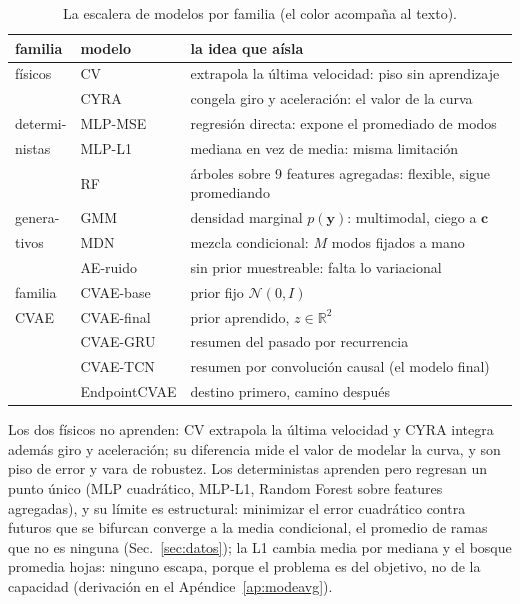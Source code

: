 \documentclass[conference,a4paper]{IEEEtran}
\begin{document}
\begin{table}[!ht]
\caption{La escalera de modelos por familia (el color acompaña al texto).}
\label{tab:escalera}
\centering
\footnotesize
\begin{tabular}{@{}l l p{4.35cm}@{}}
\toprule
familia & modelo & la idea que aísla \\
\midrule
\rowcolor{famfis} físicos & CV & extrapola la última velocidad: piso sin aprendizaje \\
\rowcolor{famfis} & CYRA & congela giro y aceleración: el valor de la curva \\
\rowcolor{famdet} determi- & MLP-MSE & regresión directa: expone el promediado de modos \\
\rowcolor{famdet} nistas & MLP-L1 & mediana en vez de media: misma limitación \\
\rowcolor{famdet} & RF & árboles sobre 9 features agregadas: flexible, sigue promediando \\
\rowcolor{famgen} genera- & GMM & densidad marginal $p(\mathbf{y})$: multimodal, ciego a $\mathbf{c}$ \\
\rowcolor{famgen} tivos & MDN & mezcla condicional: $M$ modos fijados a mano \\
\rowcolor{famgen} & AE-ruido & sin prior muestreable: falta lo variacional \\
\rowcolor{famcvae} familia & CVAE-base & prior fijo $\mathcal{N}(0,I)$ \\
\rowcolor{famcvae} CVAE & CVAE-final & prior aprendido, $z \in \mathbb{R}^2$ \\
\rowcolor{famcvae} & CVAE-GRU & resumen del pasado por recurrencia \\
\rowcolor{famcvae} & CVAE-TCN & resumen por convolución causal (el modelo final) \\
\rowcolor{famcvae} & EndpointCVAE & destino primero, camino después~\cite{pecnet} \\
\bottomrule
\end{tabular}
\end{table}

Los dos físicos no aprenden: CV extrapola la última velocidad y CYRA
integra además giro y aceleración; su diferencia mide el valor de modelar
la curva, y son piso de error y vara de robustez. Los deterministas aprenden pero regresan un punto único
(MLP cuadrático, MLP-L1, Random Forest sobre features agregadas), y su
límite es estructural: minimizar el error cuadrático contra futuros que se
bifurcan converge a la media condicional, el promedio de ramas que no es ninguna (Sec.~\ref{sec:datos}); la L1
cambia media por mediana y el bosque promedia hojas: ninguno escapa, porque
el problema es del objetivo, no de la capacidad (derivación en el
Apéndice~\ref{ap:modeavg}).
\end{document}
